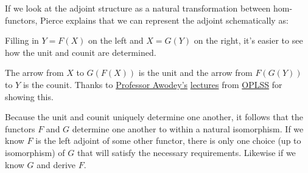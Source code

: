 \documentclass{article}
\begin{document}
\begin{enumerate}
\subitem
  If we look at the adjoint structure as a natural transformation between hom-functors, Pierce explains that we can represent the adjoint schematically as:
  \begin{mathpar}
  \end{mathpar}
  Filling in $Y = F(X)$ on the left and $X = G(Y)$ on the right, it's easier to see how the unit and counit are determined.
  \begin{mathpar}
  \end{mathpar}
  \begin{mathpar}
  \end{mathpar}
\subitem
  The arrow from $X$ to $G(F(X))$ is the unit and the arrow from $F(G(Y))$ to $Y$ is the counit.
  Thanks to \href{http://www.andrew.cmu.edu/user/awodey/}{Professor Awodey's} \href{http://www.youtube.com/watch?v=r0YOAeDJ9tU&index=10&list=PLGCr8P_YncjVjwAxrifKgcQYtbZ3zuPlb}{lectures} from \href{https://www.cs.uoregon.edu/research/summerschool/summer14/}{OPLSS} for showing this.

\subitem
  Because the unit and counit uniquely determine one another, it follows that the functors $F$ and $G$ determine one another to within a natural isomorphism.
  If we know $F$ is the left adjoint of some other functor, there is only one choice (up to isomorphism) of $G$ that will satisfy the necessary requirements.
  Likewise if we know $G$ and derive $F$.

\end{enumerate}
\end{document}
